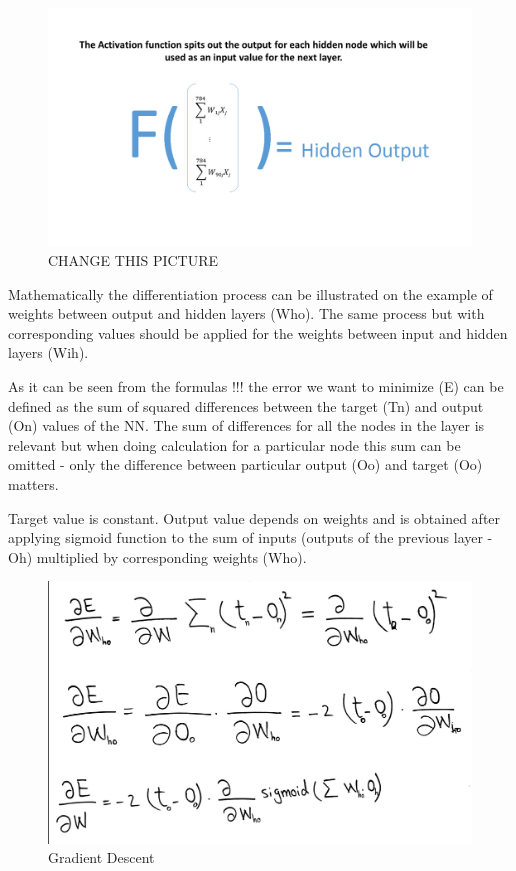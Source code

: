 \begin{figure}[H]
    \includegraphics[width=\linewidth]{pics/activation.jpg}
    \caption{\label{fig:bp} CHANGE THIS PICTURE}
\end{figure}

Mathematically the differentiation process can be illustrated on the example of weights between output and hidden layers (Who). The same process but with corresponding values should be applied for the weights between input and hidden layers (Wih).

As it can be seen from the formulas !!! the error we want to minimize (E) can be defined as the sum of squared differences between the target (Tn) and output (On) values of the NN. The sum of differences for all the nodes in the layer is relevant but when doing calculation for a particular node this sum can be omitted - only the difference between particular output (Oo) and target (Oo) matters.

Target value is constant. Output value depends on weights and is obtained after applying sigmoid function to the sum of inputs (outputs of the previous layer - Oh) multiplied by corresponding weights (Who).

\begin{figure}[H]
    \includegraphics[width=\linewidth]{pics/formula2.png}
    \caption{\label{fig:bp} Gradient Descent}
\end{figure}

